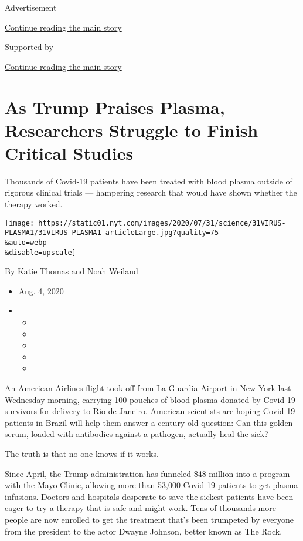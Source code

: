 Advertisement

\protect\hyperlink{after-top}{Continue reading the main story}

Supported by

\protect\hyperlink{after-sponsor}{Continue reading the main story}

\hypertarget{as-trump-praises-plasma-researchers-struggle-to-finish-critical-studies}{%
\section{As Trump Praises Plasma, Researchers Struggle to Finish
Critical
Studies}\label{as-trump-praises-plasma-researchers-struggle-to-finish-critical-studies}}

Thousands of Covid-19 patients have been treated with blood plasma
outside of rigorous clinical trials --- hampering research that would
have shown whether the therapy worked.

\texttt{[image: https://static01.nyt.com/images/2020/07/31/science/31VIRUS-PLASMA1/31VIRUS-PLASMA1-articleLarge.jpg?quality=75\\\&auto=webp\\\&disable=upscale]}

By \href{https://www.nytimes.com/by/katie-thomas}{Katie Thomas} and
\href{https://www.nytimes.com/by/noah-weiland}{Noah Weiland}

\begin{itemize}
\item
  Aug. 4, 2020
\item
  \begin{itemize}
  \item
  \item
  \item
  \item
  \item
  \end{itemize}
\end{itemize}

An American Airlines flight took off from La Guardia Airport in New York
last Wednesday morning, carrying 100 pouches of
\href{https://www.nytimes.com/2020/08/04/health/trump-plasma.html}{blood
plasma donated by Covid-19} survivors for delivery to Rio de Janeiro.
American scientists are hoping Covid-19 patients in Brazil will help
them answer a century-old question: Can this golden serum, loaded with
antibodies against a pathogen, actually heal the sick?

The truth is that no one knows if it works.

Since April, the Trump administration has funneled \$48 million into a
program with the Mayo Clinic, allowing more than 53,000 Covid-19
patients to get plasma infusions. Doctors and hospitals desperate to
save the sickest patients have been eager to try a therapy that is safe
and might work. Tens of thousands more people are now enrolled to get
the treatment that's been trumpeted by everyone from the president to
the actor Dwayne Johnson, better known as The Rock.

